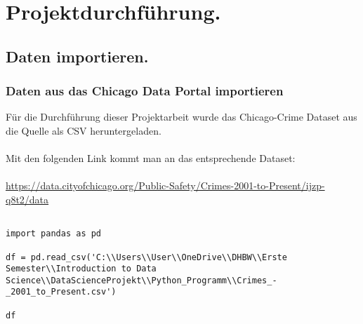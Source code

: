 \documentclass[a4paper,12pt]{article}
\begin{document}
\section{Projektdurchführung.}

\subsection{Daten importieren.}

\subsubsection{Daten aus das Chicago Data Portal importieren}
Für die Durchführung dieser Projektarbeit wurde das Chicago-Crime Dataset aus die Quelle als CSV heruntergeladen.\\
\\Mit den folgenden Link kommt man an das entsprechende Dataset:\\
\\
\url{https://data.cityofchicago.org/Public-Safety/Crimes-2001-to-Present/ijzp-q8t2/data}\\

\begin{verbatim}

import pandas as pd

df = pd.read_csv('C:\\Users\\User\\OneDrive\\DHBW\\Erste Semester\\Introduction to Data Science\\DataScienceProjekt\\Python_Programm\\Crimes_-_2001_to_Present.csv')

df

\end{verbatim}
\end{document}
